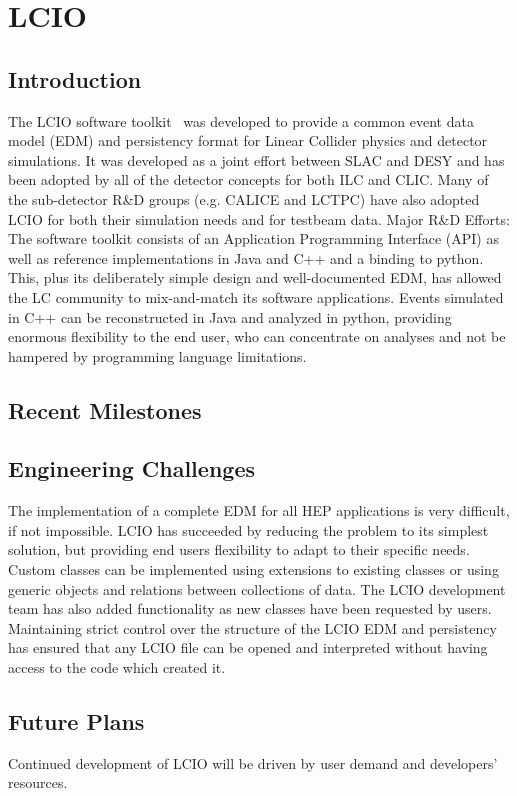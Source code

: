 \section{LCIO}

\subsection{Introduction}
The LCIO software toolkit~\cite{lcioWebsite} was developed to provide a common event data model
(EDM) and persistency format for Linear Collider physics and detector
simulations. It was developed as a joint effort between SLAC and DESY and has
been adopted by all of the detector concepts for both ILC and CLIC. Many of
the sub-detector R\&D groups (e.g. CALICE and LCTPC) have also adopted LCIO for
both their simulation needs and for testbeam data. Major R\&D Efforts: The
software toolkit consists of an Application Programming Interface (API) as well
as reference implementations in Java and C++ and a binding to python. This, plus
its deliberately simple design and well-documented EDM, has allowed the LC
community to mix-and-match its software applications. Events simulated in C++
can be reconstructed in Java and analyzed in python, providing enormous
flexibility to the end user, who can concentrate on analyses and not be hampered
by programming language limitations.

\subsection{Recent Milestones}


\subsection{Engineering Challenges}
The implementation of a complete EDM for all HEP applications is very difficult,
if not impossible. LCIO has succeeded by reducing the problem to its simplest
solution, but providing end users flexibility to adapt to their specific needs.
Custom classes can be implemented using extensions to existing classes or using
generic objects and relations between collections of data. The LCIO development
team has also added functionality as new classes have been requested by users.
Maintaining strict control over the structure of the LCIO EDM and persistency
has ensured that any LCIO file can be opened and interpreted without having
access to the code which created it.

\subsection{Future Plans}
Continued development of LCIO will be driven by user demand and developers' resources.

